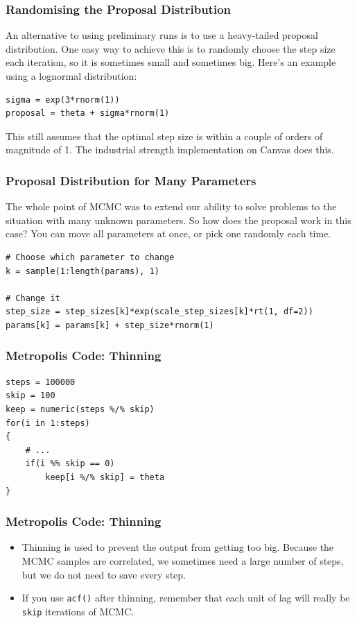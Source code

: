 \documentclass{beamer}
\begin{document}
\begin{frame}[fragile]
\frametitle{Randomising the Proposal Distribution}
An alternative to using preliminary runs is to use a heavy-tailed proposal
distribution. One easy way to achieve this is to randomly choose the step
size each iteration, so it is sometimes small and sometimes big.
Here's an example using a lognormal distribution:

\begin{verbatim}
sigma = exp(3*rnorm(1))
proposal = theta + sigma*rnorm(1)
\end{verbatim}

\pause

This still assumes that the optimal step size is within a couple of orders
of magnitude of 1. The industrial strength implementation on Canvas does this.

\end{frame}


\begin{frame}[fragile]
\frametitle{Proposal Distribution for Many Parameters}
The whole point of MCMC was to extend our ability to solve problems to the
situation with many unknown parameters. So how does the proposal work in this
case? You can move all parameters at once, or pick one randomly each time.

{\small
\begin{verbatim}
# Choose which parameter to change
k = sample(1:length(params), 1)

# Change it
step_size = step_sizes[k]*exp(scale_step_sizes[k]*rt(1, df=2))
params[k] = params[k] + step_size*rnorm(1)
\end{verbatim}
} %

\end{frame}





\begin{frame}[fragile]
\frametitle{Metropolis Code: Thinning}
\begin{verbatim}
steps = 100000
skip = 100
keep = numeric(steps %/% skip)
for(i in 1:steps)
{
    # ...
    if(i %% skip == 0)
        keep[i %/% skip] = theta
}
\end{verbatim}
\end{frame}


\begin{frame}[fragile]
\frametitle{Metropolis Code: Thinning}
\begin{itemize}
\item Thinning is used to prevent the output from getting too big.
Because the MCMC samples are correlated, we sometimes need a large number
of steps, but we do not need to save every step. \pause
\item If you use \texttt{acf()} after thinning, remember that each unit
of lag will really be \texttt{skip} iterations of MCMC.
\end{itemize}
\end{frame}
\end{document}
